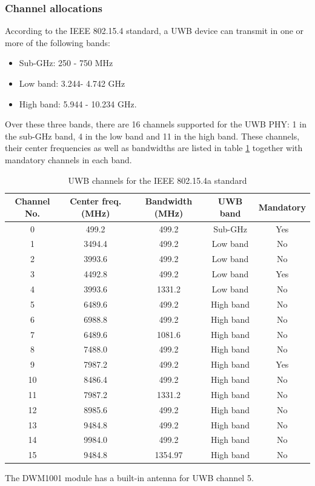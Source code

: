 \documentclass[\main/main.tex]{subfiles}
\begin{document}
\subsubsection{Channel allocations}
According to the IEEE 802.15.4 standard, a UWB device can transmit in one or more of the following bands:
\begin{itemize}
    \item Sub-GHz: 250 - 750 MHz
    \item Low band: 3.244- 4.742 GHz
    \item High band: 5.944 - 10.234 GHz.
\end{itemize}

Over these three bands, there are 16 channels supported for the UWB PHY: 1 in the sub-GHz band, 4 in the low band and 11 in the high band. These channels, their center frequencies as well as bandwidths are listed in table \ref{tab:uwb_channels_for_the_IEEE_802_15_4a_standard} together with mandatory channels in each band.

\begin{table}[H]
    \centering
    \begin{tabular}{ |c|c|c|c|c| } 
        \hline
        Channel No. & Center freq. (MHz) & Bandwidth (MHz) & UWB band & Mandatory \\\hline
        0& 499.2& 499.2& Sub-GHz& Yes \\\hline
        1& 3494.4& 499.2& Low band& No \\\hline
        2& 3993.6& 499.2& Low band& No \\\hline
        3& 4492.8& 499.2& Low band& Yes \\\hline
        4& 3993.6& 1331.2& Low band& No \\\hline
        5& 6489.6& 499.2& High band& No \\\hline
        6& 6988.8& 499.2& High band& No \\\hline
        7& 6489.6& 1081.6& High band& No \\\hline
        8& 7488.0& 499.2& High band& No \\\hline
        9& 7987.2& 499.2& High band& Yes \\\hline
        10& 8486.4& 499.2& High band& No \\\hline
        11& 7987.2& 1331.2& High band& No \\\hline
        12& 8985.6& 499.2& High band& No \\\hline
        13& 9484.8& 499.2& High band& No \\\hline
        14& 9984.0& 499.2& High band& No \\\hline
        15& 9484.8& 1354.97& High band& No \\\hline
    \end{tabular}
    \caption{UWB channels for the IEEE 802.15.4a standard}
    \label{tab:uwb_channels_for_the_IEEE_802_15_4a_standard}
\end{table}

The DWM1001 module has a built-in antenna for UWB channel 5.
\bib
\end{document}
